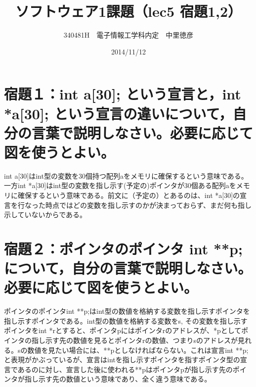 \documentclass{jsarticle}
\title{ソフトウェア1課題（lec5 宿題1,2）}
\author{340481H　電子情報工学科内定　中里徳彦}
\date{2014/11/12}
\begin{document}
\maketitle

\section{宿題１：int a[30]; という宣言と，int *a[30]; という宣言の違いについて，自分の言葉で説明しなさい。必要に応じて図を使うとよい。}

int a[30]はint型の変数を30個持つ配列aをメモリに確保するという意味である。一方int *a[30]はint型の変数を指し示す(予定の)ポインタが30個ある配列aをメモリに確保するという意味である。前文に（予定の）とあるのは、int *a[30]の宣言を行なった時点ではどの変数を指し示すのかが決まっておらず、まだ何も指し示していないからである。

\section{宿題２：ポインタのポインタ int **p; について，自分の言葉で説明しなさい。必要に応じて図を使うとよい。}

ポインタのポインタint **p;はint型の数値を格納する変数を指し示すポインタを指し示すポインタである。int型の数値を格納する変数をs, その変数を指し示すポインタをint *rとすると、ポインタpにはポインタrのアドレスが、*pとしてポインタの指し示す先の数値を見るとポインタrの数値、つまりsのアドレスが見れる。sの数値を見たい場合には、**pとしなければならない。これは宣言int **p;と表現がかぶっているが、宣言はintを指し示すポインタを指すポインタ型の宣言であるのに対し、宣言した後に使われる**pはポインタpが指し示す先のポインタが指し示す先の数値という意味であり、全く違う意味である。
\end{document}
